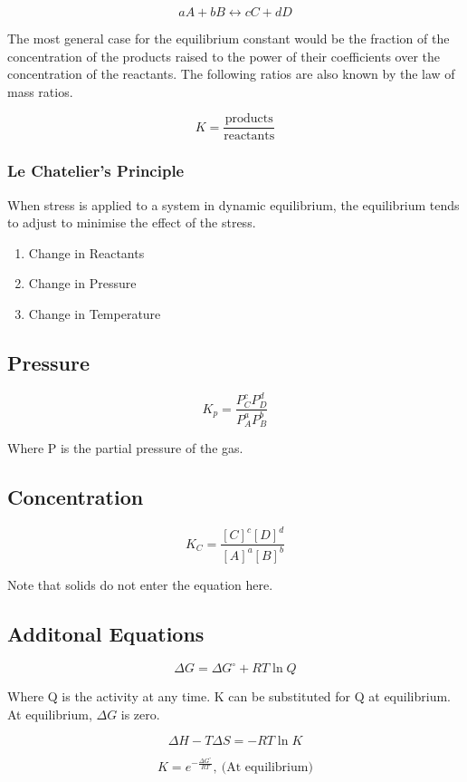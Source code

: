 \documentclass{article}
\begin{document}
\[
a A + b B \leftrightarrow c C + d D
\]


The most general case for the equilibrium constant would be the fraction of the concentration of the products raised to the power of their coefficients over the concentration of the reactants. The following ratios are also known by the law of mass ratios.

\[
K = \frac{\text{products}}{\text{reactants}}
\]

\subsubsection{Le Chatelier's Principle}
When stress is applied to a system in dynamic equilibrium, the equilibrium tends to adjust to minimise the effect of the stress.

\begin{enumerate}
\item Change in Reactants
\item Change in Pressure
\item Change in Temperature
\end{enumerate}

\subsection{Pressure}

\[
K_p= \frac{P_C^c P_D^d}{P_A^a P_B^b}
\]

Where P is the partial pressure of the gas.

\subsection{Concentration}

\[
K_C = \frac{[C]^c [D]^d}{[A]^a [B]^b}
\]

Note that solids do not enter the equation here.

\subsection{Additonal Equations}
\[
\Delta G = \Delta G^{\circ} + RT \ln Q
\]

Where Q is the activity at any time. K can be substituted for Q at equilibrium. At equilibrium, $\Delta G$ is zero.

\[
\Delta H - T\Delta S = -RT \ln K
\]

\[
K = e^{-\frac{\Delta G^{\circ}}{RT}},\ \text{(At equilibrium)}
\]
\end{document}
